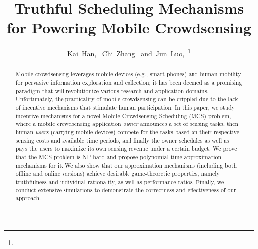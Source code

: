 \documentclass[10pt,journal,compsoc]{IEEEtran}
\begin{document}
\title{Truthful Scheduling Mechanisms for Powering Mobile Crowdsensing}

\author{Kai~Han,~
        Chi~Zhang~
        and~Jun~Luo,~\thanks{}}

\maketitle


\begin{abstract}
Mobile crowdsensing leverages mobile devices (e.g., smart phones) and human mobility for pervasive information exploration and collection; it has been deemed as a promising paradigm that will revolutionize various research and application domains. Unfortunately, the practicality of mobile crowdsensing can be crippled due to the lack of incentive mechanisms that stimulate human participation. In this paper, we study incentive mechanisms for a novel Mobile Crowdsensing Scheduling (MCS) problem, where a mobile crowdsensing application \textit{owner} announces a set of sensing tasks, then human \textit{users} (carrying mobile devices) compete for the tasks based on their respective sensing costs and available time periods, and finally the owner schedules as well as pays the users to maximize its own sensing revenue under a certain budget. We prove that the MCS problem is NP-hard and propose polynomial-time approximation mechanisms for it. We also show that our approximation mechanisms (including both offline and online versions) achieve desirable game-theoretic properties, namely truthfulness and individual rationality, as well as  performance ratios. Finally, we conduct extensive simulations to demonstrate the correctness and effectiveness of our approach.
\end{abstract}

\IEEEpeerreviewmaketitle
\end{document}
